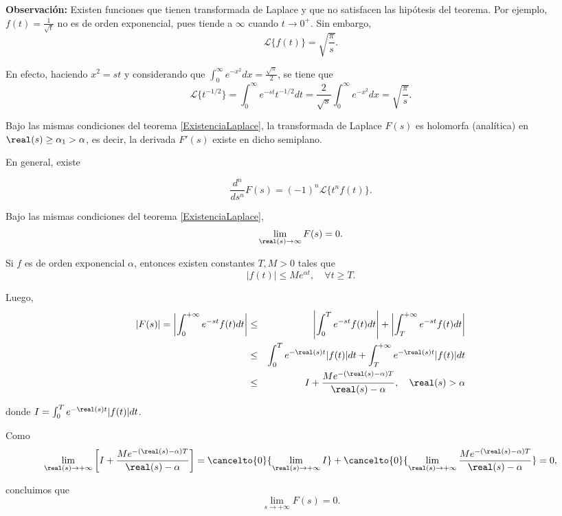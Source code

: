 \textbf{Observación:} Existen funciones que tienen transformada de Laplace y que no satisfacen las hipótesis del teorema. Por ejemplo, $f(t) = \frac{1}{\sqrt{t}}$ no es de orden exponencial, pues tiende a $\infty$ cuando $t \to 0^+$. Sin embargo,
\begin{equation*}
\mathcal{L}\{f(t)\} = \sqrt{\frac{\pi}{s}}.
\end{equation*}

En efecto, haciendo $x^2 = st$ y considerando que $\int_0^{\infty} e^{-x^2} dx = \frac{\sqrt{\pi}}{2}$, se tiene que
\begin{equation*}
\mathcal{L}\{t^{-1/2}\} = \int_0^{\infty} e^{-st}t^{-1/2}dt = \frac{2}{\sqrt{s}} \int_0^{\infty} e^{-x^2} dx = \sqrt{\frac{\pi}{s}}.
\end{equation*}

\begin{teorema}
    Bajo las mismas condiciones del teorema \ref{ExistenciaLaplace}, la transformada de Laplace $F(s)$ es holomorfa (analítica) en $\real(s) \geq \alpha_1 > \alpha$, es decir, la derivada $F'(s)$ existe en dicho semiplano.
\end{teorema}

En general, existe
\begin{shaded}
$$\frac{d^n}{ds^n} F(s) = (-1)^n \mathcal{L}\{t^n f(t)\}.$$
\end{shaded}

\begin{propo} \label{T.LaplaceLim}
Bajo las mismas condiciones del teorema \ref{ExistenciaLaplace},
$$\lim_{\real(s) \to \infty} F(s) = 0.$$
\end{propo}

\begin{demo}
    Si $f$ es de orden exponencial $\alpha$, entonces existen constantes  $T, M >0$ tales que
\begin{equation*}
|f(t)| \leq M e^{\alpha t}, \quad \forall t \geq T.
\end{equation*}

Luego,
\begin{eqnarray*}
\left|F(s)\right| = \left| \int_0^{+\infty} e^{-st} f(t) dt \right| &\leq &\left| \int_0^{T} e^{-st} f(t) dt \right| + \left| \int_T^{+\infty} e^{-st} f(t) dt \right| \\
& \leq & \int_0^T e^{-\real(s)t} |f(t)| dt +  \int_T^{+\infty} e^{-\real(s)t} |f(t)| dt \\
& \leq & I + \frac{M e^{-(\real(s)-\alpha)T}}{\real(s)-\alpha}, \quad \real(s) > \alpha
\end{eqnarray*}

donde $I = \int_0^T e^{-\real(s)t} |f(t)| dt$.

Como 
\begin{equation*}
\lim_{\real(s) \to +\infty} \left[ I + \frac{M e^{-(\real(s)-\alpha)T}}{\real(s) -\alpha} \right] = \cancelto{0}{\lim_{\real(s) \to +\infty} I} +  \cancelto{0}{\lim_{\real(s) \to +\infty} \frac{M e^{-(\real(s)-\alpha)T}}{\real(s) -\alpha}} = 0,
\end{equation*}

concluimos que
$$\lim_{s \to + \infty} F(s) = 0.$$
\end{demo}

